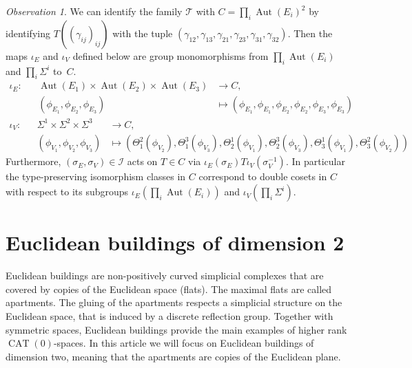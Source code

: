 \documentclass[dvipsnames]{article}
\theoremstyle{definition}
\theoremstyle{remark}
\newtheorem{observation}[theorem]{Observation}
\DeclareMathOperator{\CAT}{CAT}
\DeclareMathOperator{\Aut}{Aut}
\begin{document}
    \begin{observation}\label{obs:double_cosets}
    We can identify the family $\mathcal T$ with $C = \prod_i\Aut(E_i)^2$ by
    identifying $T((\gamma_{ij})_{ij})$ with the tuple
    $(\gamma_{12},\allowbreak \gamma_{13},\allowbreak \gamma_{21},\allowbreak \gamma_{23},\allowbreak \gamma_{31},\allowbreak \gamma_{32})$. Then the maps $\iota_E$ and $\iota_V$ defined below are group monomorphisms from $\prod_i \Aut( E_i)$ and $\prod_i \Sigma^i$ to~$C$.
    \begin{align*}
        \iota_E :&
        &\Aut(E_1) \times \Aut(E_2) \times \Aut(E_3) &\to C,\\
        &&(\phi_{E_1}, \phi_{E_2}, \phi_{E_3}) &\mapsto (\phi_{E_1}, \phi_{E_1}, \phi_{E_2}, \phi_{E_2}, \phi_{E_3}, \phi_{E_3}) \hspace{3cm}
    \end{align*}
    \begin{align*}
        \iota_V :&
        & \Sigma^1 \times \Sigma^2 \times \Sigma^3 & \to C,\\
        &&(\phi_{V_1}, \phi_{V_2}, \phi_{V_3}) & \mapsto
        (\Theta_1^2(\phi_{V_2}), \Theta_1^3(\phi_{V_3}), \Theta_2^1(\phi_{V_1}), \Theta_2^3(\phi_{V_3}), \Theta_3^1(\phi_{V_1}),\Theta_3^2(\phi_{V_2}))
    \end{align*}
    Furthermore, $(\sigma_E, \sigma_V) \in \mathcal I$ acts on $T \in C$ via $\iota_E(\sigma_E) T \iota_V(\sigma_V^{-1})$. In particular the type-preserving isomorphism classes in $C$ correspond to double cosets in $C$ with respect to its subgroups $\iota_E \left(\prod_i \Aut( E_i)\right)$ and $\iota_V\left(\prod_i \Sigma^i\right)$.
    \end{observation}

\section{Euclidean buildings of dimension 2}\label{sec:buildings}
    Euclidean buildings are non-positively curved simplicial complexes that are covered by copies of the Euclidean space (flats). The maximal flats are called apartments.
    The gluing of the apartments respects a simplicial structure on the Euclidean space, that is induced by a discrete reflection group.
    Together with symmetric spaces, Euclidean buildings provide the main examples of higher rank $\CAT(0)$-spaces.
    In this article we will focus on Euclidean buildings of dimension two, meaning that the apartments are copies of the Euclidean plane.
    
\end{document}
